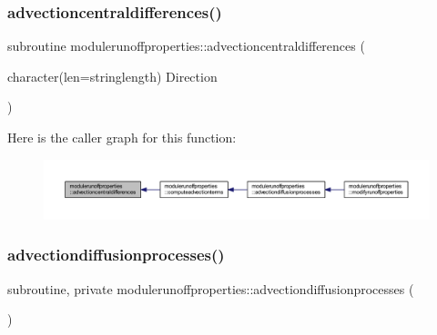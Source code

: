 \subsubsection{\texorpdfstring{advectioncentraldifferences()}{advectioncentraldifferences()}}
{\footnotesize\ttfamily subroutine modulerunoffproperties\+::advectioncentraldifferences (\begin{DoxyParamCaption}\item[{character(len=stringlength)}]{Direction }\end{DoxyParamCaption})\hspace{0.3cm}{\ttfamily [private]}}

Here is the caller graph for this function\+:\nopagebreak
\begin{figure}[H]
\begin{center}
\leavevmode
\includegraphics[width=350pt]{namespacemodulerunoffproperties_addd3719940508b59af78d352984c8274_icgraph}
\end{center}
\end{figure}
\mbox{\label{namespacemodulerunoffproperties_ae6b8378908b26858152e5bb2b1132217}} 
\subsubsection{\texorpdfstring{advectiondiffusionprocesses()}{advectiondiffusionprocesses()}}
{\footnotesize\ttfamily subroutine, private modulerunoffproperties\+::advectiondiffusionprocesses (\begin{DoxyParamCaption}{ }\end{DoxyParamCaption})\hspace{0.3cm}{\ttfamily [private]}}

